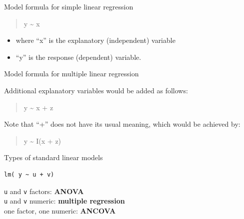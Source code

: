 \documentclass[
  ignorenonframetext,
]{beamer}
\providecommand{\tightlist}{%
  \setlength{\itemsep}{0pt}\setlength{\parskip}{0pt}}
\begin{document}
\begin{frame}{Model formula for simple linear regression}
\protect\hypertarget{model-formula-for-simple-linear-regression}{}

\begin{quote}
y \textasciitilde{} x
\end{quote}

\begin{itemize}
\tightlist
\item
  where ``x'' is the explanatory (independent) variable
\item
  ``y'' is the response (dependent) variable.
\end{itemize}

\end{frame}

\begin{frame}{Model formula for multiple linear regression}
\protect\hypertarget{model-formula-for-multiple-linear-regression}{}

Additional explanatory variables would be added as follows:

\begin{quote}
y \textasciitilde{} x + z
\end{quote}

Note that ``+'' does not have its usual meaning, which would be achieved
by:

\begin{quote}
y \textasciitilde{} I(x + z)
\end{quote}

\end{frame}

\begin{frame}[fragile]{Types of standard linear models}
\protect\hypertarget{types-of-standard-linear-models}{}

\begin{verbatim}
lm( y ~ u + v)
\end{verbatim}

\texttt{u} and \texttt{v} factors: \textbf{ANOVA}\\
\texttt{u} and \texttt{v} numeric: \textbf{multiple regression}\\
one factor, one numeric: \textbf{ANCOVA}

\end{frame}
\end{document}
